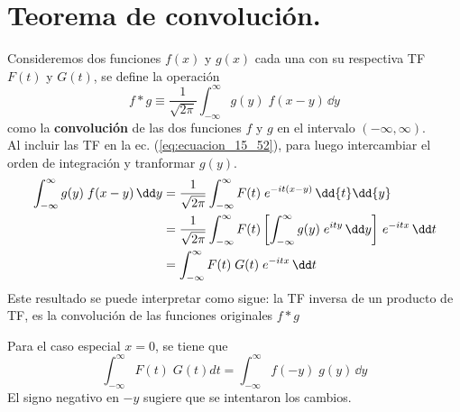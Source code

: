 \section{Teorema de convolución.}
Consideremos dos funciones $f(x)$ y $g(x)$ cada una con su respectiva TF $F(t)$ y $G(t)$, se define la operación
\begin{equation}
f * g \equiv \dfrac{1}{\sqrt{2 \pi}} \int_{-\infty}^{\infty} g(y) \; f(x - y) \, \dd y
\label{eq:ecuacion_15_52}
\end{equation}
como la \textbf{convolución} de las dos funciones $f$ y $g$ en el intervalo $(-\infty, \infty)$. 
\\
Al incluir las TF en la ec. (\ref{eq:ecuacion_15_52}), para luego intercambiar el orden de integración y tranformar $g(y)$. 
\begin{align}
\int_{-\infty}^{\infty} g(y) \; f(x - y) \, \dd y &= \dfrac{1}{\sqrt{2 \pi}} \int_{-\infty}^{\infty} F(t) \; e^{-it(x - y)} \, \dd{t} \dd{y} \saltosin
&= \dfrac{1}{\sqrt{2 \pi}} \int_{-\infty}^{\infty} F(t) \left[ \int_{-\infty}^{\infty} g(y) \; e^{ity} \, \dd y \right] \, e^{-itx} \, \dd t \saltosin
&= \int_{-\infty}^{\infty} F(t) \; G(t) \; e^{-itx} \, \dd t \label{eq:ecuacion_15_53}
\end{align}
Este resultado se puede interpretar como sigue: la TF inversa de un producto de TF, es la convolución de las funciones originales $f * g$
\par
Para el caso especial $x = 0$, se tiene que
\begin{equation}
\int_{-\infty}^{\infty} F(t) \; G(t) dt = \int_{-\infty}^{\infty} f(-y) \; g(y) \, \dd y
\label{eq:ecuacion_15_54}
\end{equation}
El signo negativo en $-y$ sugiere que se intentaron los cambios.
